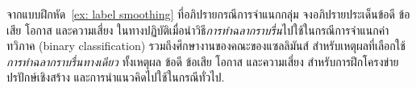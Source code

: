 \begin{Exercise}
	\label{ex: label smoothing binary classification}
	
	จากแบบฝึกหัด~\ref{ex: label smoothing} ที่อภิปรายกรณีการจำแนกกลุ่ม
	จงอภิปรายประเด็นข้อดี ข้อเสีย โอกาส และความเสี่ยง ในทางปฏิบัติเมื่อนำวิธี\textit{การทำฉลากราบรื่น}ไปใช้ในกรณีการจำแนกค่าทวิภาค (binary classification)
	รวมถึงศึกษางานของคณะของแซลลิมันส์\cite{SalimansEtAl2016} สำหรับเหตุผลที่เลือกใช้\textit{การทำฉลากราบรื่นทางเดียว}
	ทั้งเหตุผล ข้อดี ข้อเสีย โอกาส และความเสี่ยง สำหรับการฝึกโครงข่ายปรปักษ์เชิงสร้าง และการนำแนวคิดไปใช้ในกรณีทั่วไป.

\end{Exercise}

%
%
%	
%	
%
%	
%	
%
%
%	
%	
%
%
%	
%	
%
%	
%	



